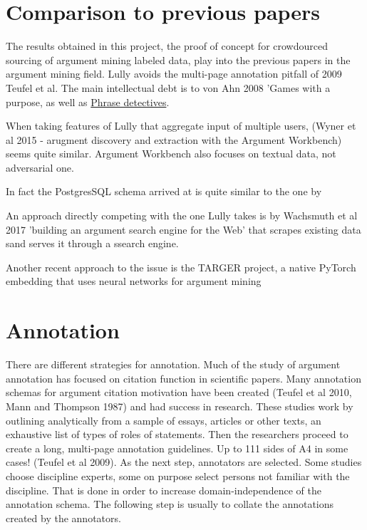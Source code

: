\documentclass{report}
\begin{document}
\section{Comparison to previous papers}
The results obtained in this project, the proof of concept for crowdourced sourcing of argument mining labeled data, play into the previous papers in the argument mining field.
Lully avoids the multi-page annotation pitfall of 2009 Teufel et al.
The main intellectual debt is to von Ahn 2008 'Games with a purpose, as well as \href{https://dl.acm.org/doi/10.1145/2448116.2448119}{Phrase detectives}.
\cite{poesio_phrase_2013}

When taking features of Lully that aggregate input of multiple users, (Wyner et al 2015 - arugment discovery and extraction with the Argument Workbench) seems quite similar. Argument Workbench also focuses on textual data, not adversarial one. 

In fact the PostgresSQL schema arrived at is quite similar to the one by 


An approach directly competing with the one Lully takes is by Wachsmuth et al 2017 'building an argument search engine for the Web' that scrapes existing data sand serves it through a ssearch engine.


Another recent approach to the issue is the TARGER project, a native PyTorch embedding that uses neural networks for argument mining



\section{Annotation}
There are different strategies for annotation. Much of the study of argument annotation has focused on citation function in scientific papers.
Many annotation schemas for argument citation motivation have been created (Teufel et al 2010, Mann and Thompson 1987) and had success in research.
These studies work by outlining analytically from a sample of essays, articles or other texts, an exhaustive list of types of roles of statements.
Then the researchers proceed to create a long, multi-page annotation guidelines. Up to 111 sides of A4 in some cases! (Teufel et al 2009).
As the next step, annotators are selected. Some studies choose discipline experts, some on purpose select persons not familiar with the discipline.
That is done in order to increase domain-independence of the annotation schema.
The following step is usually to collate the annotations created by the annotators. 
\end{document}
